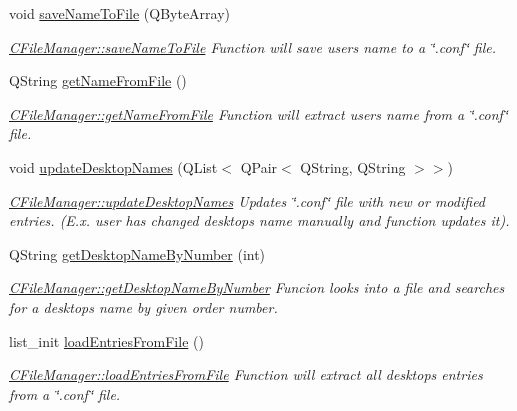 \begin{DoxyCompactItemize}
void \hyperlink{classCFileManager_a4722bc73ddd3e128774856beea01c61e}{save\+Name\+To\+File} (Q\+Byte\+Array)
\begin{DoxyCompactList}\small\item\em \hyperlink{classCFileManager_a4722bc73ddd3e128774856beea01c61e}{C\+File\+Manager\+::save\+Name\+To\+File} Function will save user\textquotesingle{}s name to a \char`\"{}.\+conf\char`\"{} file. \end{DoxyCompactList}\item 
Q\+String \hyperlink{classCFileManager_afe80a483037c156eaa4fd6ee7fb51b29}{get\+Name\+From\+File} ()
\begin{DoxyCompactList}\small\item\em \hyperlink{classCFileManager_afe80a483037c156eaa4fd6ee7fb51b29}{C\+File\+Manager\+::get\+Name\+From\+File} Function will extract user\textquotesingle{}s name from a \char`\"{}.\+conf\char`\"{} file. \end{DoxyCompactList}\item 
void \hyperlink{classCFileManager_af7a175f29201617ed7d299747d5a3e0f}{update\+Desktop\+Names} (Q\+List$<$ Q\+Pair$<$ Q\+String, Q\+String $>$$>$)
\begin{DoxyCompactList}\small\item\em \hyperlink{classCFileManager_af7a175f29201617ed7d299747d5a3e0f}{C\+File\+Manager\+::update\+Desktop\+Names} Updates \char`\"{}.\+conf\char`\"{} file with new or modified entries. (E.\+x. user has changed desktop\textquotesingle{}s name manually and function updates it). \end{DoxyCompactList}\item 
Q\+String \hyperlink{classCFileManager_a1c091b725f7040679f7d71de748a2335}{get\+Desktop\+Name\+By\+Number} (int)
\begin{DoxyCompactList}\small\item\em \hyperlink{classCFileManager_a1c091b725f7040679f7d71de748a2335}{C\+File\+Manager\+::get\+Desktop\+Name\+By\+Number} Funcion looks into a file and searches for a desktop\textquotesingle{}s name by given order number. \end{DoxyCompactList}\item 
list\+\_\+init \hyperlink{classCFileManager_a3478ad92b96489069a2ede4140de2ba6}{load\+Entries\+From\+File} ()
\begin{DoxyCompactList}\small\item\em \hyperlink{classCFileManager_a3478ad92b96489069a2ede4140de2ba6}{C\+File\+Manager\+::load\+Entries\+From\+File} Function will extract all desktop\textquotesingle{}s entries from a \char`\"{}.\+conf\char`\"{} file. \end{DoxyCompactList}\item 
$$
\end{DoxyCompactItemize}

